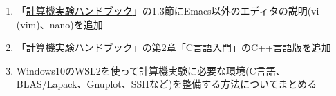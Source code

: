 \documentclass[11pt]{jarticle}
\begin{document}
\begin{enumerate}
\item 「\href{https://github.com/utphys-comp/handbook/releases/download/handbook-2019/handbook.pdf}{計算機実験ハンドブック}」の1.3節にEmacs以外のエディタの説明(vi (vim)、nano)を追加

\item 「\href{https://github.com/utphys-comp/handbook/releases/download/handbook-2019/handbook.pdf}{計算機実験ハンドブック}」の第2章「C言語入門」のC++言語版を追加

\item Windows10のWSL2を使って計算機実験に必要な環境(C言語、BLAS/Lapack、Gnuplot、SSHなど)を整備する方法についてまとめる

\end{enumerate}  
\end{document}
